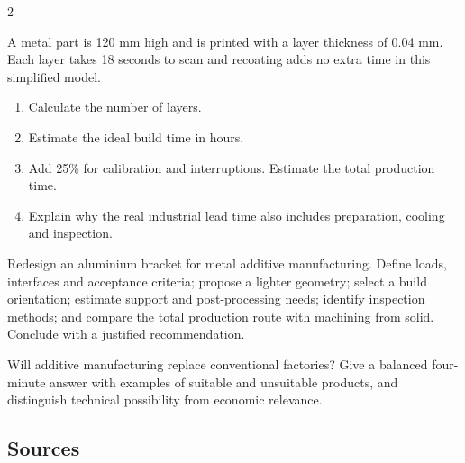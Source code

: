 \begin{multicols}{2}
\begin{applicationexercise}
A metal part is 120 mm high and is printed with a layer thickness of 0.04 mm. Each layer takes
18 seconds to scan and recoating adds no extra time in this simplified model.
\begin{enumerate}
\item Calculate the number of layers.
\item Estimate the ideal build time in hours.
\item Add 25\% for calibration and interruptions. Estimate the total production time.
\item Explain why the real industrial lead time also includes preparation, cooling and inspection.
\end{enumerate}
\end{applicationexercise}

\begin{engineeringchallenge}
Redesign an aluminium bracket for metal additive manufacturing. Define loads, interfaces and
acceptance criteria; propose a lighter geometry; select a build orientation; estimate support and
post-processing needs; identify inspection methods; and compare the total production route with
machining from solid. Conclude with a justified recommendation.
\end{engineeringchallenge}

\begin{speaking}
Will additive manufacturing replace conventional factories? Give a balanced four-minute answer with
examples of suitable and unsuitable products, and distinguish technical possibility from economic
relevance.
\end{speaking}
\end{multicols}

\subsection*{Sources}
